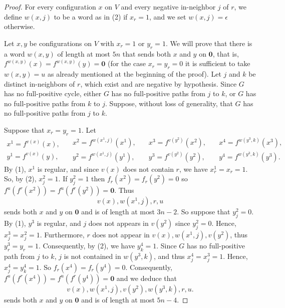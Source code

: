 \documentclass[11pt,letter]{article}
\newcommand{\ZERO}{{\mathbf{0}}}
\begin{document}
\begin{proof}
\bigskip
For every configuration $x$ on $V$ and every negative in-neighbor $j$ of $r$, we define $w(x,j)$ to be a word as in (2) if $x_{r}=1$, and we set $w(x,j)=\epsilon$ otherwise. 

\medskip
Let $x,y$ be configurations on $V$ with $x_{r}=1$ or $y_{r}=1$. We will prove that there is a word $w(x,y)$ of length at most $5n$ that sends both $x$ and $y$ on $\ZERO$, that is, $f^{w(x,y)}(x)=f^{w(x,y)}(y)=\ZERO$ (for the case $x_{r}=y_{r}=0$ it is sufficient to take $w(x,y)=u$ as already mentioned at the beginning of the proof). Let $j$ and $k$ be distinct in-neighbors of $r$, which exist and are negative by hypothesis. Since $G$ has no full-positive cycle, either $G$ has no full-positive paths from $j$ to $k$, or $G$ has no full-positive paths from $k$ to $j$. Suppose, without loss of generality, that $G$ has no full-positive paths from $j$ to $k$.

\medskip
Suppose that $x_{r}=y_{r}=1$. Let 
\[
\begin{array}{l}
x^1=f^{v(x)}(x),\\
y^1=f^{v(x)}(y),
\end{array}
\quad
\begin{array}{l}
x^2=f^{w(x^1,j)}(x^1),\\
y^2=f^{w(x^1,j)}(y^1),
\end{array}
\quad
\begin{array}{l}
x^3=f^{v(y^2)}(x^2),\\
y^3=f^{v(y^2)}(y^2),
\end{array}
\quad
\begin{array}{l}
x^4=f^{w(y^3,k)}(x^3),\\
y^4=f^{w(y^3,k)}(y^3).
\end{array}
\]
By (1), $x^1$ is regular, and since $v(x)$ does not contain $r$, we have $x^1_{r}=x_{r}=1$. So, by (2), $x^2_j=1$. If $y^2_j=1$ then $f_{r}(x^2)=f_{r}(y^2)=0$ so $f^u(f^{r}(x^2))=f^u(f^{r}(y^2))=\ZERO$. Thus
\[
v(x),w(x^1,j),r,u
\]
sends both $x$ and $y$ on $\ZERO$ and is of length at most $3n-2$. So suppose that $y^2_j=0$. By (1), $y^3$ is regular, and $j$ does not appears in $v(y^2)$ since $y^2_j=0$. Hence, $x^3_j=x^2_j=1$. Furthermore, $r$ does not appear in $v(x),w(x^1,j),v(y^2)$, thus $y^3_{r}=y_{r}=1$. Consequently, by (2), we have $y^4_k=1$. Since $G$ has no full-positive path from $j$ to $k$, $j$ is not contained in $w(y^3,k)$, and thus $x^4_j=x^3_j=1$. Hence, $x^4_j=y^4_k=1$. So $f_{r}(x^4)=f_{r}(y^4)=0$. Consequently, $f^u(f^{r}(x^4))=f^u(f^{r}(y^4))=\ZERO$ and we deduce that 
\[
v(x),w(x^1,j),v(y^2),w(y^3,k),r,u. 
\]
sends both $x$ and $y$ on $\ZERO$ and is of length at most $5n-4$. 


\end{proof}
\end{document}
